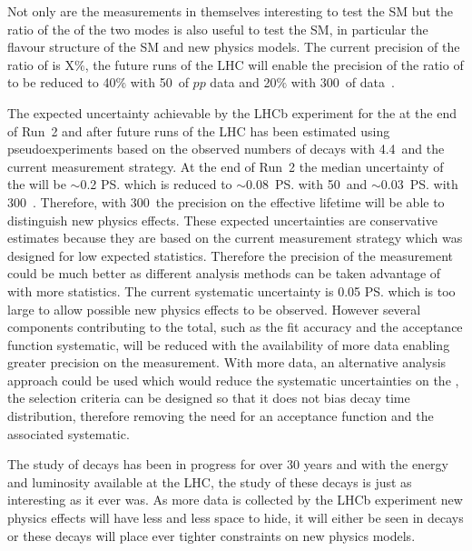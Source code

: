 Not only are the \BF measurements in themselves interesting to test the SM but the ratio of the \BFs of the two modes is also useful to test the SM, in particular the flavour structure of the SM and new physics models. The current precision of the ratio of \BFs is X$\%$, the future runs of the LHC will enable the precision of the ratio of \BFs to be reduced to 40$\%$ with 50~\fb of $pp$ data and 20$\%$ with 300~\fb of data~\cite{Aaij:2244311}. 

The expected uncertainty achievable by the LHCb experiment for the \el at the end of Run~2 and after future runs of the LHC has been estimated using pseudoexperiments based on the observed numbers of decays with 4.4~\fb and the current measurement strategy. At the end of Run~2 the median uncertainty of the \el will be $\sim$0.2 \ps which is reduced to $\sim$0.08~\ps with 50~\fb and $\sim$0.03~\ps with 300~\fb. Therefore, with 300~\fb the precision on the effective lifetime will be able to distinguish new physics effects. These expected uncertainties are conservative estimates because they are based on the current measurement strategy which was designed for low expected statistics. Therefore the precision of the measurement could be much better as different analysis methods can be taken advantage of with more statistics. 
The current systematic uncertainty is 0.05 \ps which is too large to allow possible new physics effects to be observed. However several components contributing to the total, such as the fit accuracy and the acceptance function systematic, will be reduced with the availability of more data enabling greater precision on the measurement. With more data, an alternative analysis approach could be used which would reduce the systematic uncertainties on the \el, the selection criteria can be designed so that it does not bias \bsmumu decay time distribution, therefore removing the need for an acceptance function and the associated systematic.


The study of \bmumu decays has been in progress for over 30 years and with the energy and luminosity available at the LHC, the study of these decays is just as interesting as it ever was. As more data is collected by the LHCb experiment new physics effects will have less and less space to hide, it will either be seen in \bmumu decays or these decays will place ever tighter constraints on new physics models. 
